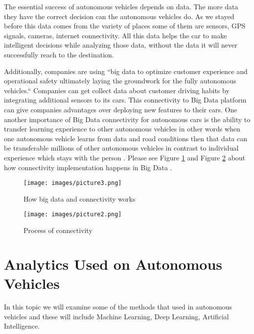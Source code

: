 \documentclass[sigconf]{acmart}
\begin{document}
\par The essential success of autonomous vehicles depends on data. The more data they have the correct decision can the autonomous vehicles do. As we stayed before this data comes from the variety of places some of them are sensors, GPS signals, cameras, internet connectivity. All this data helps the car to make intelligent decisions while analyzing those data, without the data it will never successfully reach to the destination\cite{www-kdnuggets}.

\par Additionally, companies are using ``big data to optimize customer experience and operational safety ultimately laying the groundwork for the fully autonomous vehicles\cite{www-webo}.`` Companies can get collect data about customer driving habits by integrating additional sensors to its cars\cite{www-hb.org}. This connectivity to Big Data platform can give companies advantages over deploying new features to their cars. One another importance of Big Data connectivity for autonomous cars is the ability to transfer learning experience to other autonomous vehicles in other words when one autonomous vehicle learns from data and road conditions then that data can be transferable millions of other autonomous vehicles in contrast to individual experience which stays with the person \cite{www-hb.org}. Please see Figure \ref{fig:connectivity} and Figure \ref{fig:hbsconnectivitysteps} about how connectivity implementation happens in Big Data \cite{www-hb.org}. 

\begin{figure}[!ht]
  \centering
      \texttt{[image: images/picture3.png]}
  \caption{How big data and connectivity works}\label{fig:connectivity}
\end{figure}

\begin{figure}[!ht]
  \centering
      \texttt{[image: images/picture2.png]}
  \caption{Process of connectivity}\label{fig:hbsconnectivitysteps}
\end{figure}


\section{Analytics Used on Autonomous Vehicles}
In this topic we will examine some of the methods that used in autonomous vehicles and these will include Machine Learning, Deep Learning, Artificial Intelligence.
\end{document}
